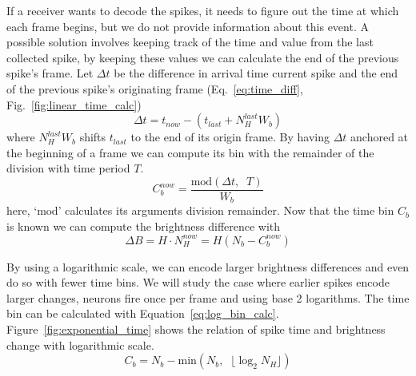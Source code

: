 \documentclass[conference]{IEEEtran}
\begin{document}
If a receiver wants to decode the spikes, it needs to figure out the time at which each frame begins, but we do not provide information about this event. A possible solution involves keeping track of the time and value from the last collected spike, by keeping these values we can calculate the end of the previous spike's frame. Let $\Delta t$ be the difference in arrival time current spike and the end of the previous spike's originating frame (Eq.~\ref{eq:time_diff}, Fig.~\ref{fig:linear_time_calc})
\begin{equation}
\Delta t = t_{now} -  \left(t_{last} + N_{H}^{last}W_{b}\right)
\label{eq:time_diff}
\end{equation}
where $N_{H}^{last}W_{b}$ shifts $t_{last}$ to the end of its origin frame. By having $\Delta t$ anchored at the beginning of a frame we can compute its bin with the remainder of the division with time period $T$.
\begin{equation}
C^{now}_{b} = \frac{ \mathrm{mod}\left(\Delta t, \;\; T\right) }{ W_{b} }
\label{eq:bin_compute}
\end{equation}
here, `$\mathrm{mod}$' calculates its arguments division remainder. Now that the time bin $C_{b}$ is known we can compute the brightness difference with
\begin{equation}
 \Delta B = H\cdot N_{H}^{now} =  H\left(N_{b} - C^{now}_{b}\right) 
 \label{eq:new_Nh_linear}
\end{equation}

By using a logarithmic scale, we can encode larger brightness differences and even do so with fewer time bins. We will study the case where earlier spikes encode larger changes, neurons fire once per frame and using base 2 logarithms. 
The time bin can be calculated with Equation~\ref{eq:log_bin_calc}. Figure~\ref{fig:exponential_time} shows the relation of spike time and brightness change with logarithmic scale.
\begin{equation}
\label{eq:log_bin_calc}
C_{b} = N_{b} - \mathrm{min}\left( N_{b}, \;\; \lfloor\log_{2} N_{H}\rfloor \right) 
\end{equation}
\end{document}
